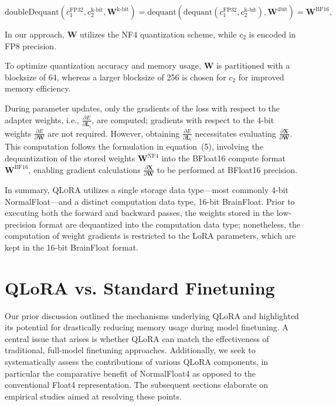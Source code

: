 \begin{equation}
    \text{doubleDequant}(c_1^{\text{FP32}}, c_2^{\text{k-bit}}, \mathbf{W}^{\text{k-bit}}) = \text{dequant}(\text{dequant}(c_1^{\text{FP32}}, c_2^{\text{k-bit}}), \mathbf{W}^{\text{4bit}}) = \mathbf{W}^{\text{BF16}},
\end{equation}

In our approach, $\mathbf{W}$ utilizes the NF4 quantization scheme, while $c_2$ is encoded in FP8 precision.

To optimize quantization accuracy and memory usage, $\mathbf{W}$ is partitioned with a blocksize of 64, whereas a larger blocksize of 256 is chosen for $c_2$ for improved memory efficiency.

During parameter updates, only the gradients of the loss with respect to the adapter weights, i.e., $\frac{\partial E}{\partial \mathbf{L}_i}$, are computed; gradients with respect to the 4-bit weights $\frac{\partial E}{\partial \mathbf{W}}$ are not required. However, obtaining $\frac{\partial E}{\partial \mathbf{L}_i}$ necessitates evaluating $\frac{\partial \mathbf{X}}{\partial \mathbf{W}}$. This computation follows the formulation in equation~(5), involving the dequantization of the stored weights $\mathbf{W}^{\text{NF4}}$ into the BFloat16 compute format $\mathbf{W}^{\text{BF16}}$, enabling gradient calculations $\frac{\partial \mathbf{X}}{\partial \mathbf{W}}$ to be performed at BFloat16 precision.

In summary, \textsc{QLoRA} utilizes a single storage data type—most commonly 4-bit NormalFloat—and a distinct computation data type, 16-bit BrainFloat. Prior to executing both the forward and backward passes, the weights stored in the low-precision format are dequantized into the computation data type; nonetheless, the computation of weight gradients is restricted to the LoRA parameters, which are kept in the 16-bit BrainFloat format.

\section{QLoRA vs. Standard Finetuning}
\label{sec:comp_to_std}

Our prior discussion outlined the mechanisms underlying QLoRA and highlighted its potential for drastically reducing memory usage during model finetuning. A central issue that arises is whether QLoRA can match the effectiveness of traditional, full-model finetuning approaches. Additionally, we seek to systematically assess the contributions of various QLoRA components, in particular the comparative benefit of NormalFloat4 as opposed to the conventional Float4 representation. The subsequent sections elaborate on empirical studies aimed at resolving these points.

